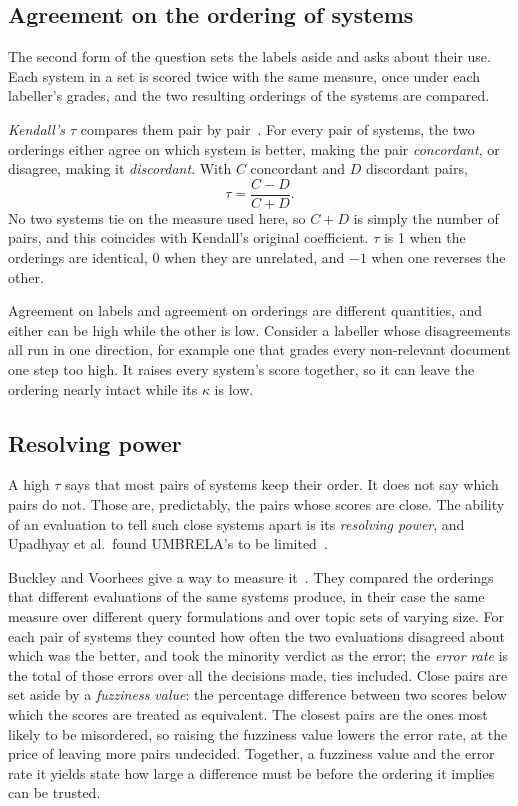 \subsection*{Agreement on the ordering of systems}

The second form of the question sets the labels aside and asks about their use. Each
system in a set is scored twice with the same measure, once under each labeller's
grades, and the two resulting orderings of the systems are compared.

\emph{Kendall's $\tau$} compares them pair by pair~\cite{kendall1938tau}. For every
pair of systems, the two orderings either agree on which system is better, making the
pair \emph{concordant}, or disagree, making it \emph{discordant}. With $C$ concordant
and $D$ discordant pairs,
\begin{equation}
\tau = \frac{C - D}{C + D} .
\end{equation}
No two systems tie on the measure used here, so $C + D$ is simply the number of pairs,
and this coincides with Kendall's original coefficient. $\tau$ is 1 when the orderings
are identical, 0 when they are unrelated, and $-1$ when one reverses the other.

Agreement on labels and agreement on orderings are different quantities, and either
can be high while the other is low. Consider a labeller whose disagreements all run in
one direction, for example one that grades every non-relevant document one step too
high. It raises every system's score together, so it can leave the ordering nearly
intact while its $\kappa$ is low.

\subsection*{Resolving power}

A high $\tau$ says that most pairs of systems keep their order. It does not say which
pairs do not. Those are, predictably, the pairs whose scores are close. The ability of an evaluation to tell such close systems apart is its \emph{resolving power}, and Upadhyay et al.\ found UMBRELA's to be limited~\cite{upadhyay2025umbrela}.

Buckley and Voorhees give a way to measure it~\cite{buckley2000stability}. They
compared the orderings that different evaluations of the same systems produce, in
their case the same measure over different query formulations and over topic sets of
varying size. For each pair of systems they counted how often the two evaluations
disagreed about which was the better, and took the minority verdict as the error; the
\emph{error rate} is the total of those errors over all the decisions made, ties
included. Close pairs are set aside by a \emph{fuzziness value}: the percentage difference between two scores below which the scores are treated as equivalent. The closest pairs are the ones
most likely to be misordered, so raising the fuzziness value lowers the error rate, at
the price of leaving more pairs undecided. Together, a fuzziness value and the error
rate it yields state how large a difference must be before the ordering it implies can
be trusted.


